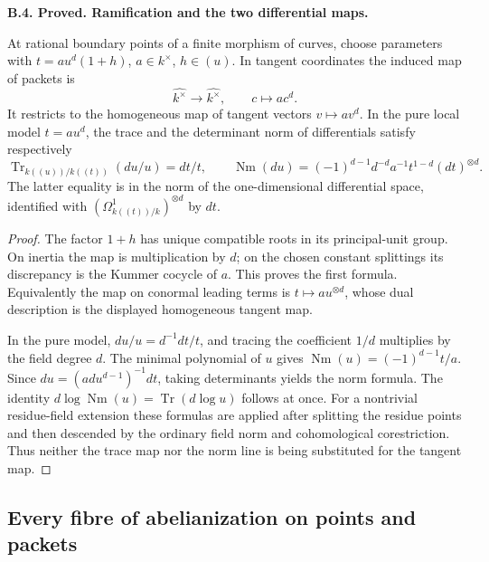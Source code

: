 \documentclass[11pt,oneside]{article}
\makeatletter
\newcounter{statementanchor}
\newenvironment{statement}[3]{%
 \refstepcounter{statementanchor}\def\@currentlabel{#1}%
 \par\addvspace{9pt}\noindent
 \textbf{#1. #2. #3.}\par\nobreak\noindent\ignorespaces
}{\par\addvspace{5pt}}
\makeatother
\begin{document}
\begin{statement}{B.4}{Proved}{Ramification and the two differential maps}
\label{st:B.4}

At rational boundary points of a finite morphism of curves, choose
parameters with
$t=a u^d(1+h)$, $a\in k^\times$, $h\in(u)$.
In tangent coordinates the induced map of packets is
\[
 \widehat{k^\times}\longrightarrow\widehat{k^\times},
 \qquad c\longmapsto a c^d.
\]
It restricts to the homogeneous map of tangent vectors
$v\mapsto a v^d$.  In the pure local model $t=a u^d$, the trace and
the determinant norm of differentials satisfy respectively
\[
 \operatorname{Tr}_{k((u))/k((t))}(du/u)=dt/t,
 \qquad
 \operatorname{Nm}(du)=
   (-1)^{d-1}d^{-d}a^{-1}t^{1-d}(dt)^{\otimes d}.
\]
The latter equality is in the norm of the one-dimensional differential
space, identified with $(\Omega^1_{k((t))/k})^{\otimes d}$ by $dt$.
\end{statement}
\begin{proof}
The factor $1+h$ has unique compatible roots in its principal-unit group.
On inertia the map is multiplication by $d$; on the chosen constant
splittings its discrepancy is the Kummer cocycle of $a$.  This proves
the first formula.  Equivalently the map on conormal leading terms is
$t\mapsto a u^{\otimes d}$, whose dual description is the displayed
homogeneous tangent map.

In the pure model, $du/u=d^{-1}dt/t$, and tracing the coefficient
$1/d$ multiplies by the field degree $d$.  The minimal polynomial of
$u$ gives $\operatorname{Nm}(u)=(-1)^{d-1}t/a$.  Since
$du=(ad u^{d-1})^{-1}dt$, taking determinants yields the norm formula.
The identity
$d\log\operatorname{Nm}(u)=\operatorname{Tr}(d\log u)$ follows at once.
For a nontrivial residue-field extension these formulas are applied
after splitting the residue points and then descended by the ordinary
field norm and cohomological corestriction.  Thus neither the trace
map nor the norm line is being substituted for the tangent map.
\end{proof}

\subsection{Every fibre of abelianization on points and packets}
\end{document}
